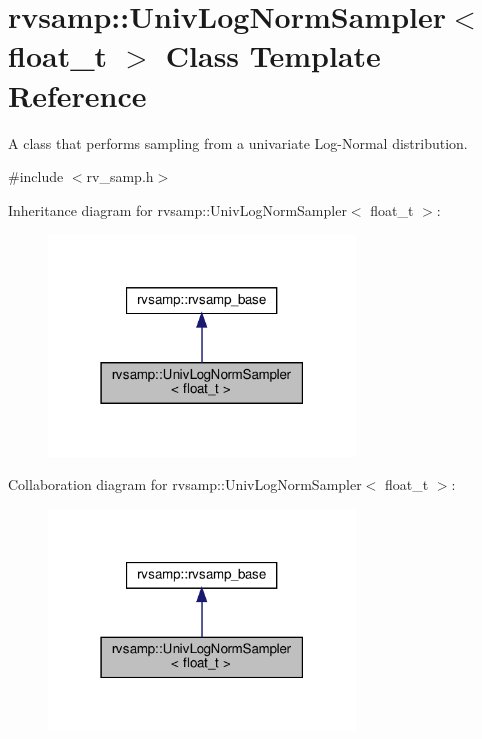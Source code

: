 \hypertarget{classrvsamp_1_1UnivLogNormSampler}{}\section{rvsamp\+:\+:Univ\+Log\+Norm\+Sampler$<$ float\+\_\+t $>$ Class Template Reference}
\label{classrvsamp_1_1UnivLogNormSampler}


A class that performs sampling from a univariate Log-\/\+Normal distribution.  




{\ttfamily \#include $<$rv\+\_\+samp.\+h$>$}



Inheritance diagram for rvsamp\+:\+:Univ\+Log\+Norm\+Sampler$<$ float\+\_\+t $>$\+:\nopagebreak
\begin{figure}[H]
\begin{center}
\leavevmode
\includegraphics[width=231pt]{classrvsamp_1_1UnivLogNormSampler__inherit__graph}
\end{center}
\end{figure}


Collaboration diagram for rvsamp\+:\+:Univ\+Log\+Norm\+Sampler$<$ float\+\_\+t $>$\+:\nopagebreak
\begin{figure}[H]
\begin{center}
\leavevmode
\includegraphics[width=231pt]{classrvsamp_1_1UnivLogNormSampler__coll__graph}
\end{center}
\end{figure}
